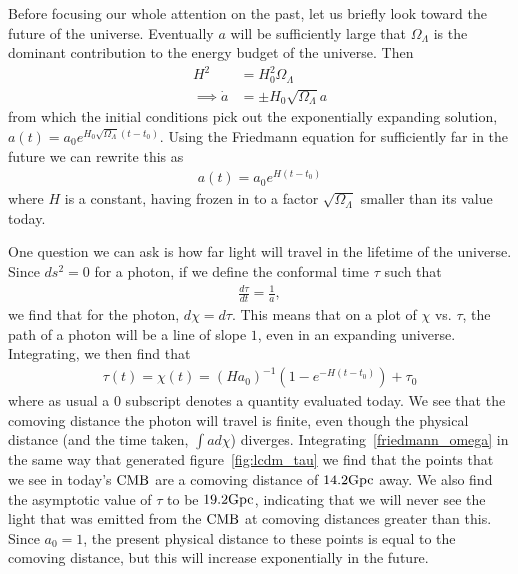     Before focusing our whole attention on the past, let us briefly
    look toward the future of the universe. Eventually $a$ will be
    sufficiently large that $\Omega_{\Lambda}$
    is the dominant contribution to the energy budget of the universe.
    Then
    \begin{align}
        H^2 &= H_0^2\Omega_{\Lambda}\\
        \implies \dot{a} &= \pm H_0\sqrt{\Omega_{\Lambda}}a
    \end{align}
    from which the initial conditions pick out the exponentially expanding solution,\\
    ${a(t)=a_0e^{H_0\sqrt{\Omega_{\Lambda}}\left(t-t_0\right)}}$. Using the Friedmann equation
    for sufficiently far in the future we can rewrite this as
    \begin{align}
        a(t)=a_0e^{H\left(t-t_0\right)}
    \end{align}
    where $H$ is a constant, having frozen in to a factor $\sqrt{\Omega_{\Lambda}}$ smaller than
    its value today.


    One question we can ask is how far light will travel in the lifetime of the universe.
    Since $ds^2=0$ for a photon, if we define the conformal time $\tau$ such that
    \begin{align}\label{conformal_time_defn}
        \frac{d\tau}{dt} = \frac{1}{a},
    \end{align}
    we find that for the photon, $d\chi=d\tau$.
    This means that on a plot of $\chi$ vs. $\tau$, the path of a photon
    will be a line of slope $1$, even in an expanding universe.
    Integrating, we then find that
    \begin{align}
        \tau(t)=\chi(t)=(Ha_0)^{-1}\left(1-e^{-H(t-t_0)}\right)+\tau_0
    \end{align}
    where as usual a $0$ subscript denotes a quantity evaluated today.
    We see that the comoving distance the photon will travel is finite, even though the physical
    distance (and the time taken, $\int a d\chi$) diverges.
    Integrating~\eqref{friedmann_omega} in the same way that generated figure~\ref{fig:lcdm_tau}
    we find that the points that we see in today's $\text{CMB}$ are a comoving distance of $14.2\text{Gpc}$ away.
    We also find the asymptotic value of $\tau$ to be $19.2\text{Gpc}$, indicating that we will never see the
    light that was emitted from the $\text{CMB}$ at comoving distances greater than this.
    Since $a_0=1$, the present physical distance to these points is equal to the comoving distance,
    but this will increase exponentially in the future.

